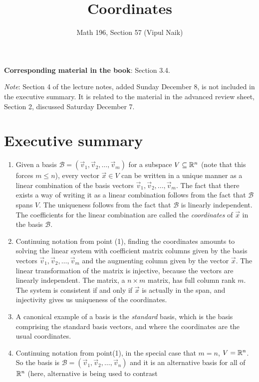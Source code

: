 \documentclass[10pt]{amsart}
\title{Coordinates}
\author{Math 196, Section 57 (Vipul Naik)}
\begin{document}
\maketitle

{\bf Corresponding material in the book}: Section 3.4.

{\em Note}: Section 4 of the lecture notes, added Sunday December 8,
is not included in the executive summary. It is related to the
material in the advanced review sheet, Section 2, discussed Saturday
December 7.

\section*{Executive summary}

\begin{enumerate}
\item Given a basis $\mathcal{B} =
  (\vec{v}_1,\vec{v}_2,\dots,\vec{v}_m)$ for a subspace $V \subseteq
  \mathbb{R}^n$ (note that this forces $m \le n$), every vector $\vec{x} \in
  V$ can be written in a unique manner as a linear combination of the
  basis vectors $\vec{v}_1,\vec{v}_2,\dots,\vec{v}_m$. The fact that
  there exists a way of writing it as a linear combination follows
  from the fact that $\mathcal{B}$ spans $V$. The uniqueness follows
  from the fact that $\mathcal{B}$ is linearly independent. The
  coefficients for the linear combination are called the {\em
    coordinates} of $\vec{x}$ in the basis $\mathcal{B}$.
\item Continuing notation from point (1), finding the coordinates
  amounts to solving the linear system with coefficient matrix columns
  given by the basis vectors $\vec{v}_1,\vec{v}_2,\dots,\vec{v}_m$ and
  the augmenting column given by the vector $\vec{x}$. The linear
  transformation of the matrix is injective, because the vectors are
  linearly independent. The matrix, a $n \times m$ matrix, has full
  column rank $m$. The system is consistent if and only if $\vec{x}$ is
  actually in the span, and injectivity gives us uniqueness of the
  coordinates.
\item A canonical example of a basis is the {\em standard} basis, which
  is the basis comprising the standard basis vectors, and where the
  coordinates are the usual coordinates.
\item Continuing notation from point(1), in the special case that $m =
  n$, $V = \mathbb{R}^n$. So the basis is $\mathcal{B} =
  (\vec{v}_1,\vec{v}_2,\dots,\vec{v}_n)$ and it is an alternative
  basis for all of $\mathbb{R}^n$ (here, alternative is being used to contrast

\end{enumerate}
\end{document}
